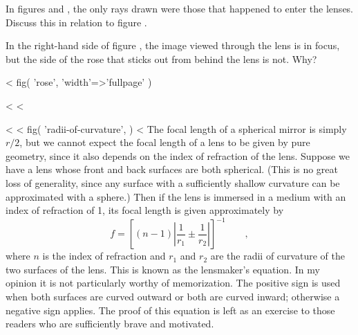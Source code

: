 \begin{dq}
In figures  and , the only rays drawn were those
that happened to enter the lenses. Discuss this in
relation to figure .
\end{dq}

\begin{dq}\label{dq:rose-image-focus}
In the right-hand side of figure , the image viewed
through the lens is in focus, but the side of the rose that
sticks out from behind the lens is not. Why?
\end{dq}

<%
  fig(
    'rose',
    {
      'width'=>'fullpage'
    }
  )

<%
<%

<%
<%
  fig(
    'radii-of-curvature',
  )
<%
The focal length of a spherical mirror is simply $r/2$, but
we cannot expect the focal length of a lens to be given by
pure geometry, since it also depends on the index of
refraction of the lens. Suppose we have a lens whose front
and back surfaces are both spherical. (This is no great loss
of generality, since any surface with a sufficiently shallow
curvature can be approximated with a sphere.) Then if the
lens is immersed in a medium with an index of refraction of
1, its focal length is given approximately by
\begin{equation*}
 f = \left[(n-1)\left|\frac{1}{r_1}\pm\frac{1}{r_2}\right|\right]^{-1} \qquad ,
\end{equation*}
where $n$ is the index of refraction and $r_1$ and $r_2$ are
the radii of curvature of the two surfaces of the lens. This
is known as the lensmaker's equation. In my opinion it is
not particularly worthy of memorization. The positive sign
is used when both surfaces are curved outward or both are
curved inward; otherwise a negative sign applies. The proof
of this equation is left as an exercise to those readers who
are sufficiently brave and motivated.

